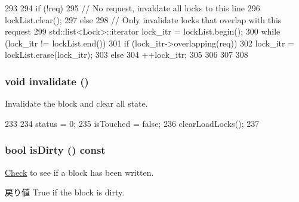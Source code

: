 \begin{DoxyCode}
293     {
294         if (!req) {
295             // No request, invaldate all locks to this line
296             lockList.clear();
297         } else {
298             // Only invalidate locks that overlap with this request
299             std::list<Lock>::iterator lock_itr = lockList.begin();
300             while (lock_itr != lockList.end()) {
301                 if (lock_itr->overlapping(req)) {
302                     lock_itr = lockList.erase(lock_itr);
303                 } else {
304                     ++lock_itr;
305                 }
306             }
307         }
308     }
\end{DoxyCode}
\hypertarget{classCacheBlk_a893f1101c650c08c98612515c2b1a89c}{
\subsubsection[{invalidate}]{\setlength{\rightskip}{0pt plus 5cm}void invalidate ()}}
\label{classCacheBlk_a893f1101c650c08c98612515c2b1a89c}
Invalidate the block and clear all state. 


\begin{DoxyCode}
233     {
234         status = 0;
235         isTouched = false;
236         clearLoadLocks();
237     }
\end{DoxyCode}
\hypertarget{classCacheBlk_ad66f409af3c387e166ff7ee95169b7b6}{
\subsubsection[{isDirty}]{\setlength{\rightskip}{0pt plus 5cm}bool isDirty () const}}
\label{classCacheBlk_ad66f409af3c387e166ff7ee95169b7b6}
\hyperlink{classCheck}{Check} to see if a block has been written. \begin{DoxyReturn}{戻り値}
True if the block is dirty. 
\end{DoxyReturn}



